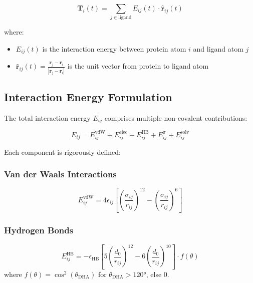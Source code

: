 \documentclass{article}
\begin{document}
\begin{equation}
\mathbf{T}_i(t) = \sum_{j \in \text{ligand}} E_{ij}(t) \cdot \hat{\mathbf{r}}_{ij}(t)
\end{equation}

where:
\begin{itemize}
    \item $E_{ij}(t)$ is the interaction energy between protein atom $i$ and ligand atom $j$
    \item $\hat{\mathbf{r}}_{ij}(t) = \frac{\mathbf{r}_j - \mathbf{r}_i}{|\mathbf{r}_j - \mathbf{r}_i|}$ is the unit vector from protein to ligand atom
\end{itemize}

\subsection{Interaction Energy Formulation}

The total interaction energy $E_{ij}$ comprises multiple non-covalent contributions:

\begin{equation}
E_{ij} = E_{ij}^{\text{vdW}} + E_{ij}^{\text{elec}} + E_{ij}^{\text{HB}} + E_{ij}^{\pi} + E_{ij}^{\text{solv}}
\end{equation}

Each component is rigorously defined:

\subsubsection{Van der Waals Interactions}
\begin{equation}
E_{ij}^{\text{vdW}} = 4\epsilon_{ij} \left[\left(\frac{\sigma_{ij}}{r_{ij}}\right)^{12} - \left(\frac{\sigma_{ij}}{r_{ij}}\right)^6\right]
\end{equation}

\subsubsection{Hydrogen Bonds}
\begin{equation}
E_{ij}^{\text{HB}} = -\epsilon_{\text{HB}} \left[5\left(\frac{d_0}{r_{ij}}\right)^{12} - 6\left(\frac{d_0}{r_{ij}}\right)^{10}\right] \cdot f(\theta)
\end{equation}
where $f(\theta) = \cos^2(\theta_{\text{DHA}})$ for $\theta_{\text{DHA}} > 120°$, else 0.
\end{document}
